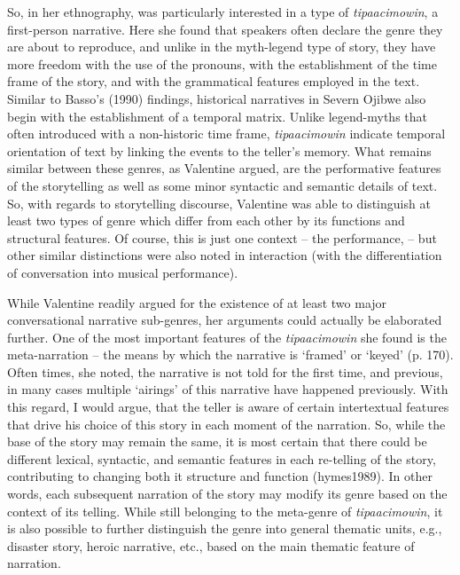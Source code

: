 \documentclass[12pt]{article}
\begin{document}
So, in her ethnography, \textcite{valentine1995} was particularly interested in a type of \textit{tipaacimowin}, a first-person narrative. Here she found that  speakers often declare the genre they are about to reproduce, and unlike in the myth-legend type of story, they have more freedom with the use of the pronouns, with the establishment of the time frame of the story, and with the grammatical features employed in the text. Similar to Basso's (1990) findings, historical narratives in Severn Ojibwe also begin with the establishment of a temporal matrix. Unlike legend-myths that often introduced with a non-historic time frame, \textit{tipaacimowin} indicate temporal orientation of text by linking the events to the teller's memory. What remains similar between these genres, as Valentine argued, are the performative features of the storytelling as well as some minor syntactic and semantic details of text. So, with regards to storytelling discourse, Valentine was able to distinguish at least two types of genre which differ from each other by its functions and structural features. Of course, this is just one context -- the performance, -- but other similar distinctions were also noted in interaction (with the differentiation of conversation into musical performance).

While Valentine readily argued for the existence of at least two major conversational narrative sub-genres, her arguments could actually be elaborated further. One of the most important features of the \textit{tipaacimowin} she found is the meta-narration -- the means by which the narrative is `framed' or `keyed' (p. 170). Often times, she noted, the narrative is not told for the first time, and previous, in many cases multiple `airings' of this narrative have happened previously. With this regard, I would argue, that the teller is aware of certain intertextual features that drive his choice of this story in each moment of the narration. So, while the base of the story may remain the same, it is most certain that there could be different  lexical, syntactic, and semantic features in each re-telling of the story, contributing to changing both it structure and function (hymes1989). In other words, each subsequent narration of the story may modify its genre based on the context of its telling. While still belonging to the meta-genre of \textit{tipaacimowin}, it is also  possible to further distinguish the genre into general thematic units, e.g., disaster story, heroic narrative, etc., based on the main thematic feature of narration.
\end{document}
